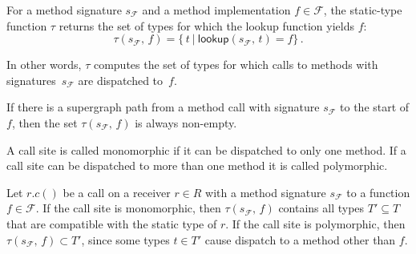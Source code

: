 \begin{definition}
  For a method signature $s_\mathcal F$ and a method implementation $f\in\mathcal F$, the static-type function $\tau$ returns the set of types for which the lookup function yields $f$:
  \begin{equation}
    \tau(s_\mathcal F,\,f)=\{\,t\ |\ \textsf{lookup}(s_\mathcal F,\,t)=f\}\,.
  \end{equation}
\end{definition}
In other words, $\tau$ computes the set of types for which calls to methods
with signatures~$s_\mathcal F$ are dispatched to~$f$.

If there is a supergraph path from a method call with signature $s_\mathcal F$ to the start of $f$, then the set $\tau(s_\mathcal F,\,f)$ is always non-empty.

\begin{definition}\label{def:momopoly}
  A call site is called monomorphic if it can be dispatched to only one method. If a call site can be dispatched to more than one method it is called polymorphic.
\end{definition}

  Let $r.c()$ be a call on a receiver $r\in R$ with a method signature $s_\mathcal F$ to a function $f\in\mathcal F$.
  If the call site is monomorphic, then $\tau(s_\mathcal F,\,f)$ contains all types $T'\subseteq T$ that are compatible with the static type of $r$.
  If the call site is polymorphic, then $\tau(s_\mathcal F,\,f)\subset T'$, since some types $t\in T'$ cause dispatch to a method other than $f$.

